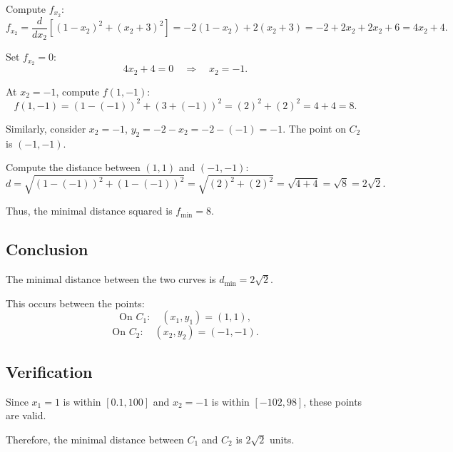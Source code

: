 \documentclass[11pt]{article}
\begin{document}
Compute \( f_{x_2} \):
\[
f_{x_2} = \frac{d}{dx_2} \left[ (1 - x_2)^2 + (x_2 + 3)^2 \right ] = -2(1 - x_2) + 2(x_2 + 3) = -2 + 2 x_2 + 2 x_2 + 6 = 4 x_2 + 4.
\]

Set \( f_{x_2} = 0 \):
\[
4 x_2 + 4 = 0 \quad \Rightarrow \quad x_2 = -1.
\]

At \( x_2 = -1 \), compute \( f(1, -1) \):
\[
f(1, -1) = (1 - (-1))^2 + (3 + (-1))^2 = (2)^2 + (2)^2 = 4 + 4 = 8.
\]

Similarly, consider \( x_2 = -1 \), \( y_2 = -2 - x_2 = -2 - (-1) = -1 \). The point on \( C_2 \) is \( (-1, -1) \).

Compute the distance between \( (1, 1) \) and \( (-1, -1) \):
\[
d = \sqrt{(1 - (-1))^2 + (1 - (-1))^2} = \sqrt{(2)^2 + (2)^2} = \sqrt{4 + 4} = \sqrt{8} = 2 \sqrt{2}.
\]

Thus, the minimal distance squared is \( f_{\text{min}} = 8 \).

\newpage

\subsection{Conclusion}

The minimal distance between the two curves is \( d_{\text{min}} = 2 \sqrt{2} \).

This occurs between the points:
\[
\text{On } C_1: \quad (x_1, y_1) = (1, 1),
\]
\[
\text{On } C_2: \quad (x_2, y_2) = (-1, -1).
\]

\newpage

\subsection{Verification}

Since \( x_1 = 1 \) is within \( [0.1, 100] \) and \( x_2 = -1 \) is within \( [-102, 98] \), these points are valid.

Therefore, the minimal distance between \( C_1 \) and \( C_2 \) is \( 2 \sqrt{2} \) units.
\end{document}
